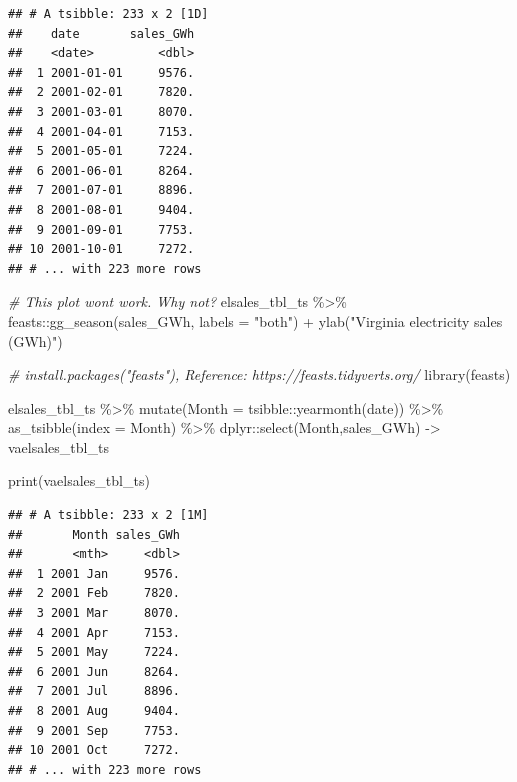 \documentclass[
]{book}
\newenvironment{Shaded}{\begin{snugshade}}{\end{snugshade}}
\newcommand{\AttributeTok}[1]{\textcolor[rgb]{0.77,0.63,0.00}{#1}}
\newcommand{\CommentTok}[1]{\textcolor[rgb]{0.56,0.35,0.01}{\textit{#1}}}
\newcommand{\FunctionTok}[1]{\textcolor[rgb]{0.00,0.00,0.00}{#1}}
\newcommand{\NormalTok}[1]{#1}
\newcommand{\OtherTok}[1]{\textcolor[rgb]{0.56,0.35,0.01}{#1}}
\newcommand{\SpecialCharTok}[1]{\textcolor[rgb]{0.00,0.00,0.00}{#1}}
\newcommand{\StringTok}[1]{\textcolor[rgb]{0.31,0.60,0.02}{#1}}
\begin{document}
\begin{verbatim}
## # A tsibble: 233 x 2 [1D]
##    date       sales_GWh
##    <date>         <dbl>
##  1 2001-01-01     9576.
##  2 2001-02-01     7820.
##  3 2001-03-01     8070.
##  4 2001-04-01     7153.
##  5 2001-05-01     7224.
##  6 2001-06-01     8264.
##  7 2001-07-01     8896.
##  8 2001-08-01     9404.
##  9 2001-09-01     7753.
## 10 2001-10-01     7272.
## # ... with 223 more rows
\end{verbatim}

\begin{Shaded}
\begin{Highlighting}[]
\CommentTok{\# This plot won\textquotesingle{}t work. Why not?}
\NormalTok{elsales\_tbl\_ts }\SpecialCharTok{\%\textgreater{}\%}
\NormalTok{  feasts}\SpecialCharTok{::}\FunctionTok{gg\_season}\NormalTok{(sales\_GWh, }\AttributeTok{labels =} \StringTok{"both"}\NormalTok{) }\SpecialCharTok{+} \FunctionTok{ylab}\NormalTok{(}\StringTok{"Virginia electricity sales (GWh)"}\NormalTok{)}
\end{Highlighting}
\end{Shaded}

\begin{Shaded}
\begin{Highlighting}[]
\CommentTok{\# install.packages("feasts"), Reference: https://feasts.tidyverts.org/}
\FunctionTok{library}\NormalTok{(feasts)}

\NormalTok{elsales\_tbl\_ts }\SpecialCharTok{\%\textgreater{}\%}
  \FunctionTok{mutate}\NormalTok{(}\AttributeTok{Month =}\NormalTok{ tsibble}\SpecialCharTok{::}\FunctionTok{yearmonth}\NormalTok{(date)) }\SpecialCharTok{\%\textgreater{}\%}
  \FunctionTok{as\_tsibble}\NormalTok{(}\AttributeTok{index =}\NormalTok{ Month) }\SpecialCharTok{\%\textgreater{}\%}
\NormalTok{  dplyr}\SpecialCharTok{::}\FunctionTok{select}\NormalTok{(Month,sales\_GWh) }\OtherTok{{-}\textgreater{}}\NormalTok{ vaelsales\_tbl\_ts}

\FunctionTok{print}\NormalTok{(vaelsales\_tbl\_ts)}
\end{Highlighting}
\end{Shaded}

\begin{verbatim}
## # A tsibble: 233 x 2 [1M]
##       Month sales_GWh
##       <mth>     <dbl>
##  1 2001 Jan     9576.
##  2 2001 Feb     7820.
##  3 2001 Mar     8070.
##  4 2001 Apr     7153.
##  5 2001 May     7224.
##  6 2001 Jun     8264.
##  7 2001 Jul     8896.
##  8 2001 Aug     9404.
##  9 2001 Sep     7753.
## 10 2001 Oct     7272.
## # ... with 223 more rows
\end{verbatim}
\end{document}

